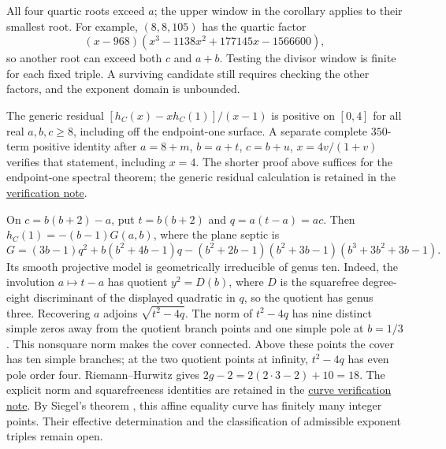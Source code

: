 All four quartic roots exceed $a$; the upper window in the corollary
applies to their smallest root. For example, $(8,8,105)$ has the
quartic factor
\[
 (x-968)(x^3-1138x^2+177145x-1566600),
\]
so another root can exceed both $c$ and $a+b$. Testing the divisor
window is finite for each fixed triple. A surviving candidate still
requires checking the other factors, and the exponent domain is unbounded.

\begin{remark}
The generic residual $[h_C(x)-xh_C(1)]/(x-1)$ is positive on
$[0,4]$ for all real $a,b,c\geq8$, including off the endpoint-one
surface. A separate complete $350$-term positive identity after
$a=8+m$, $b=a+t$, $c=b+u$, $x=4v/(1+v)$ verifies that statement,
including $x=4$. The shorter proof above suffices for the endpoint-one
spectral theorem; the generic residual calculation is retained in the
\href{https://github.com/the-omega-institute/ideal-intersection-laplacian/blob/95d8d9a90d4ef0aa06be8ba5ce70d3355838385c/notes/endpoint-one-spectral-gap.md}{verification note}.
\end{remark}

\begin{remark}
\label{rem:endpoint-one-equality-curve}
On $c=b(b+2)-a$, put $t=b(b+2)$ and $q=a(t-a)=ac$. Then
$h_C(1)=-(b-1)G(a,b)$, where the plane septic is
\[
 G=(3b-1)q^2+b(b^2+4b-1)q
   -(b^2+2b-1)(b^2+3b-1)(b^3+3b^2+3b-1).
\]
Its smooth projective model is geometrically irreducible of genus ten.
Indeed, the involution $a\mapsto t-a$ has quotient $y^2=D(b)$, where
$D$ is the squarefree degree-eight discriminant of the displayed quadratic
in $q$, so the quotient has genus three. Recovering $a$ adjoins
$\sqrt{t^2-4q}$. The norm of $t^2-4q$ has nine distinct simple zeros
away from the quotient branch points and one simple pole at $b=1/3$.
This nonsquare norm makes the cover connected. Above these points the
cover has ten simple branches; at the two quotient points at infinity,
$t^2-4q$ has even pole order four. Riemann--Hurwitz gives
$2g-2=2(2\cdot3-2)+10=18$. The explicit norm and squarefreeness
identities are retained in the
\href{https://github.com/the-omega-institute/ideal-intersection-laplacian/blob/8ed4f9014f6142949e6af40fd16e18ca304f629a/notes/endpoint-one-equality-curve.md}{curve verification note}.
By Siegel's theorem \cite{hindrysilverman,serre}, this affine equality curve
has finitely many integer points. Their effective determination and
the classification of admissible exponent triples remain open.
\end{remark}

